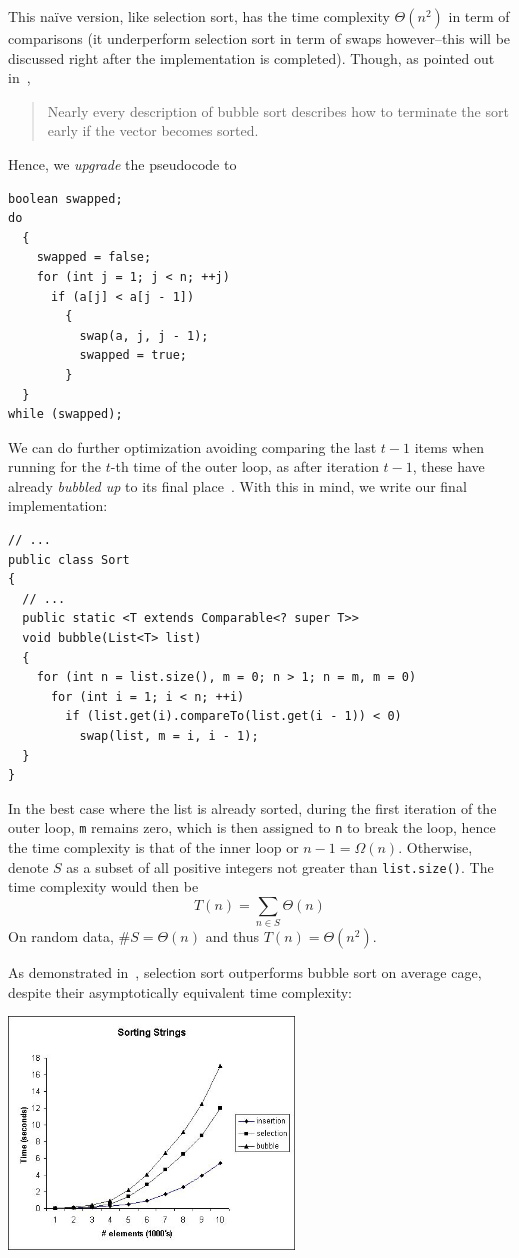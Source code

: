 \documentclass[a4paper,12pt]{article}
\begin{document}
This naïve version, like selection sort, has the time complexity $\Theta(n^2)$
in term of comparisons (it underperform selection sort in term of swaps
however--this will be discussed right after the implementation is completed).
Though, as pointed out in~\cite{bubblebad},
\begin{quote}
  Nearly every description of bubble sort describes
  how to terminate the sort early if the vector becomes sorted.
\end{quote}

Hence, we \emph{upgrade} the pseudocode to
\begin{verbatim}
boolean swapped;
do
  {
    swapped = false;
    for (int j = 1; j < n; ++j)
      if (a[j] < a[j - 1])
        {
          swap(a, j, j - 1);
          swapped = true;
        }
  }
while (swapped);
\end{verbatim}

We can do further optimization avoiding comparing the last $t - 1$ items
when running for the $t$-th time of the outer loop, as after iteration $t - 1$,
these have already \emph{bubbled up} to its final place~\cite{wikibubble}.
With this in mind, we write our final implementation:
\begin{verbatim}
// ...
public class Sort
{
  // ...
  public static <T extends Comparable<? super T>>
  void bubble(List<T> list)
  {
    for (int n = list.size(), m = 0; n > 1; n = m, m = 0)
      for (int i = 1; i < n; ++i)
        if (list.get(i).compareTo(list.get(i - 1)) < 0)
          swap(list, m = i, i - 1);
  }
}
\end{verbatim}

In the best case where the list is already sorted, during the first iteration
of the outer loop, \verb|m| remains zero, which is then assigned to \verb|n|
to break the loop, hence the time complexity is that of the inner loop
or $n - 1 = \Omega(n)$.  Otherwise, denote $S$ as a subset of all
positive integers not greater than \verb|list.size()|.  The time complexity
would then be
\[T(n) = \sum_{n\in S}\Theta(n)\]
On random data, $\#S = \Theta(n)$ and thus $T(n) = \Theta(n^2)$.

As demonstrated in~\cite{bubblebad}, selection sort outperforms bubble sort
on average cage, despite their asymptotically equivalent time complexity:
\begin{center}
  \includegraphics[width=0.57\textwidth]{bubbleplot.jpg}
\end{center}
\end{document}
